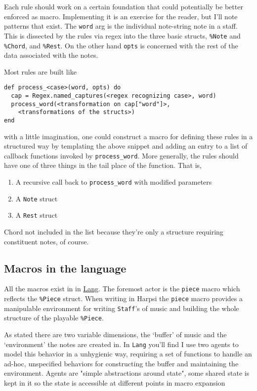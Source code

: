 \documentclass[11pt]{article}
\begin{document}
Each rule should work on a certain foundation that could
potentially be better enforced as macro. Implementing it is an
exercise for the reader, but I'll note patterns that exist. The
\verb~word~ arg is the individual note-string note in a staff. This is
dissected by the rules via regex into the three basic structs,
\verb~%Note~ and \verb~%Chord~, and \verb~%Rest~. On the other hand \verb~opts~ is
concerned with the rest of the data associated with the notes.

Most rules are built like
\begin{verbatim}
def process_<case>(word, opts) do
  cap = Regex.named_captures(<regex recognizing case>, word)
  process_word(<transformation on cap["word"]>,
    <transformations of the structs>)
end
\end{verbatim}
with a little imagination, one could construct a macro for defining
these rules in a structured way by templating the above snippet and
adding an entry to a list of callback functions invoked by
\verb~process_word~. More generally, the rules should have one of three
things in the tail place of the function. That is,
\begin{enumerate}
\item A recursive call back to \verb~process_word~ with modified parameters
\item A \verb~Note~ struct
\item A \verb~Rest~ struct
\end{enumerate}
Chord not included in the list because they're only a structure
requiring constituent notes, of course.

\subsection{Macros in the language}
\label{sec-2-2}
All the macros exist in in \href{lib/lang.ex}{Lang}. The foremost actor is
the \verb~piece~ macro which reflects the \verb~%Piece~ struct. When writing
in Harpsi the \verb~piece~ macro provides a manipulable environment for
writing \verb~Staff~'s of music and building the whole structure of the
playable \verb~%Piece~.

As stated there are two variable dimensions, the `buffer' of music
and the `environment' the notes are created in. In \verb~Lang~ you'll
find I use two agents to model this behavior in a unhygienic way,
requiring a set of functions to handle an ad-hoc, unspecified
behaviors for constructing the buffer and maintaining the
environment. Agents are "simple abstractions around state", some
shared state is kept in it so the state is accessible at different
points in macro expansion
\end{document}
